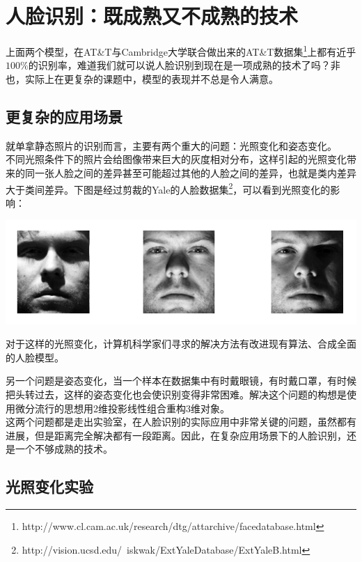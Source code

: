 \documentclass{article}
\begin{document}

\section{人脸识别：既成熟又不成熟的技术}

上面两个模型，在AT\&T与Cambridge大学联合做出来的AT\&T数据集\footnote{http://www.cl.cam.ac.uk/research/dtg/attarchive/facedatabase.html}上都有近乎$100\%$的识别率，难道我们就可以说人脸识别到现在是一项成熟的技术了吗？非也，实际上在更复杂的课题中，模型的表现并不总是令人满意。

\subsection{更复杂的应用场景}

就单拿静态照片的识别而言，主要有两个重大的问题：光照变化和姿态变化。\\

不同光照条件下的照片会给图像带来巨大的灰度相对分布，这样引起的光照变化带来的同一张人脸之间的差异甚至可能超过其他的人脸之间的差异，也就是类内差异大于类间差异。下图是经过剪裁的Yale的人脸数据集\footnote{http://vision.ucsd.edu/~iskwak/ExtYaleDatabase/ExtYaleB.html}，可以看到光照变化的影响：

\begin{center}
\includegraphics[width=0.35\linewidth]{./fig25.png}\\
\end{center}

对于这样的光照变化，计算机科学家们寻求的解决方法有改进现有算法、合成全面的人脸模型。

另一个问题是姿态变化，当一个样本在数据集中有时戴眼镜，有时戴口罩，有时候把头转过去，这样的姿态变化也会使识别变得非常困难。解决这个问题的构想是使用微分流行的思想用2维投影线性组合重构3维对象。\\

这两个问题都是走出实验室，在人脸识别的实际应用中非常关键的问题，虽然都有进展，但是距离完全解决都有一段距离。因此，在复杂应用场景下的人脸识别，还是一个不够成熟的技术。

\subsection{光照变化实验}
\end{document}
